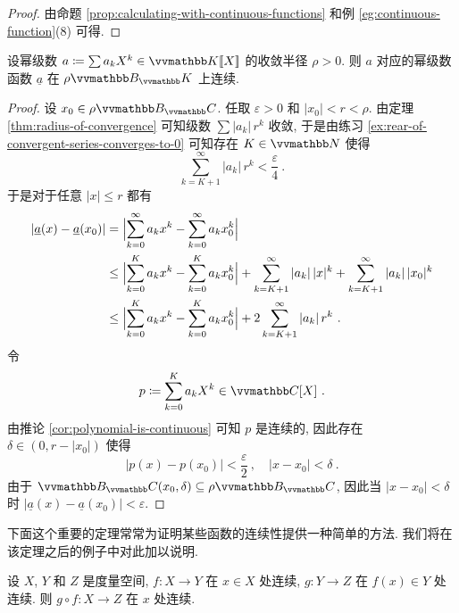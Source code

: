 \begin{proof}
    由命题 \ref{prop:calculating-with-continuous-functions} 和例 \ref{eg:continuous-function}(8) 可得.
\end{proof}

\begin{proposition}\label{prop:continuity-of-power-series}
    设幂级数 \(a \coloneqq \sum a_k X^k \in \K[\![X]\!]\) 的收敛半径 \(\rho > 0\). 则 \(a\) 对应的幂级数函数 \(\underline a\) 在 \(\rho \B_\K\) 上连续.
\end{proposition}

\begin{proof}
    设 \(x_0 \in \rho \B_\C\). 任取 \(\varepsilon > 0\) 和 \(|x_0| < r < \rho\). 由定理 \ref{thm:radius-of-convergence} 可知级数 \(\sum |a_k|\, r^k\) 收敛, 于是由练习 \ref{ex:rear-of-convergent-series-converges-to-0} 可知存在 \(K \in \N\) 使得
    \[
        \sum_{k = K + 1}^\infty |a_k|\, r^k < \frac{\varepsilon}{4}\ .
    \]
    于是对于任意 \(|x| \leq r\) 都有
    \begin{align*}
        |\underline a(x) - \underline a(x_0)| &= \Bigl| \sum_{k = 0}^\infty a_k x^k - \sum_{k = 0}^\infty a_k x_0^k \Bigr|\\
        &\leq \Bigl| \sum_{k = 0}^K a_k x^k - \sum_{k = 0}^K a_k x_0^k \Bigr| + \sum_{k = K + 1}^\infty |a_k|\, |x|^k + \sum_{k = K + 1}^\infty |a_k|\, |x_0|^k\\
        &\leq \Bigl| \sum_{k = 0}^K a_k x^k - \sum_{k = 0}^K a_k x_0^k \Bigr| + 2 \sum_{k = K + 1}^\infty |a_k|\, r^k\ .
    \end{align*}
    令
    \[
        p \coloneqq \sum_{k = 0}^K a_k X^k \in \C[X]\ .
    \]
    由推论 \ref{cor:polynomial-is-continuous} 可知 \(p\) 是连续的, 因此存在 \(\delta \in (0, r - |x_0|)\) 使得
    \[
        |p(x) - p(x_0)| < \frac{\varepsilon}{2}\ ,\quad |x - x_0| < \delta\ .
    \]
    由于 \(\B_\C(x_0, \delta) \subseteq \rho \B_\C\), 因此当 \(|x - x_0| < \delta\) 时 \(|\underline a(x) - \underline a(x_0)| < \varepsilon\).
\end{proof}

下面这个重要的定理常常为证明某些函数的连续性提供一种简单的方法. 我们将在该定理之后的例子中对此加以说明.

\begin{theorem}\label{thm:continuity-of-compositions}
    设 \(X\), \(Y\) 和 \(Z\) 是度量空间, \(f \colon X \to Y\) 在 \(x \in X\) 处连续, \(g \colon Y \to Z\) 在 \(f(x) \in Y\) 处连续. 则 \(g \circ f \colon X \to Z\) 在 \(x\) 处连续.
\end{theorem}

